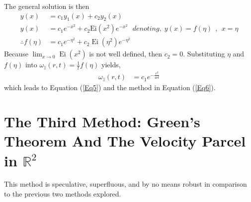 \documentclass{article}
\begin{document}
The general solution is then
\begin{align*}
    y(x) &=c_1 y_1 (x) + c_2 y_2 (x)\\
    y(x)&= c_1 e^{-x^2} + c_2 \text{Ei}(x^2) e^{-x^2} \:\:\:\textit{denoting,}\:\: y(x)=f(\eta)\:\:,\:\:x=\eta\\
    \therefore f(\eta) &= c_1 e^{-\eta^2} + c_2 \operatorname{Ei}(\eta^2) e^{-\eta^2}
\end{align*}
Because $\displaystyle \lim_{x\to 0} \operatorname{Ei}(x^2)$ is not well defined, then $c_2 =0$. Substituting $\eta$ and $f(\eta)$ into $\omega_{\hat{z}} (r,t)=\frac{1}{t}f(\eta)$ yields,
\begin{align*}
    \omega_{\hat{z}} (r,t) &= c_1 e^{-\frac{r^2}{4\nu t}}
\end{align*}
which leads to Equation (\ref{Eq5}) and the method in Equation (\ref{Eq6}).

\section{The Third Method: Green's Theorem And The Velocity Parcel in $\mathbb{R}^2$}
This method is speculative, superfluous, and by no means robust in comparison to the previous two methods explored.
\end{document}
